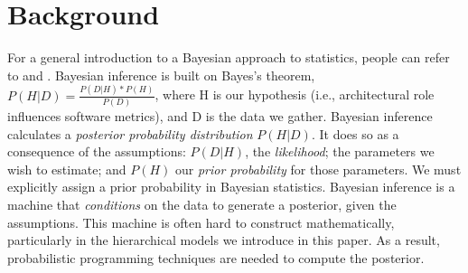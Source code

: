 \documentclass[sigconf,natbib=false]{acmart}
\begin{document}
\section{Background}
For a general introduction to a Bayesian approach to statistics, people can refer to \cite{gelman14} and \cite{mcilreath16}. Bayesian inference is built on Bayes's theorem, $P(H | D) = \frac{ P(D | H) * P(H)}{P(D)}$, where H is our hypothesis (i.e., architectural role influences software metrics), and D is the data we gather. Bayesian inference calculates a \emph{posterior probability distribution} $P(H|D)$. It does so as a consequence of the assumptions: $P(D | H)$, the \emph{likelihood}; the parameters we wish to estimate; and $P(H)$ our \emph{prior probability} for those parameters. We must explicitly assign a prior probability in Bayesian statistics. %
Bayesian inference is a machine that \emph{conditions} on the data to generate a posterior, given the assumptions. This machine is often hard to construct mathematically, particularly in the hierarchical models we introduce in this paper. As a result, probabilistic programming techniques are needed to compute the posterior. %
\end{document}
